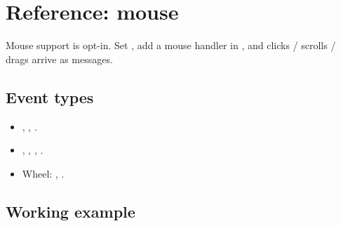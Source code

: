 \chapter{Reference: mouse}
\label{ch:refman-mouse}

\begin{aside}
Mouse support is opt-in. Set ,
add a mouse handler in , and clicks /
scrolls / drags arrive as messages.
\end{aside}

\section{Event types}

\begin{itemize}[leftmargin=*]
  \item {}, ,
    .
  \item {}, ,
    , .
  \item Wheel: ,
    .
\end{itemize}

\section{Working example}

